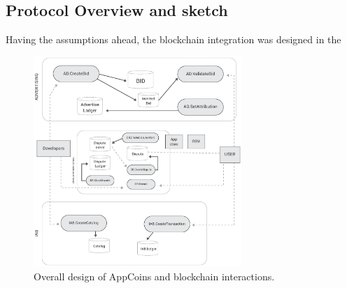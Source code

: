 \subsection{Protocol Overview and sketch}


Having the assumptions ahead, the blockchain integration was designed in the 

\begin{figure}[!ht]
\centering
\includegraphics[width=0.7\textwidth]{diagrams/design.eps}
\caption{Overall design of AppCoins and blockchain interactions.}
\label{fig:design}
\end{figure}






%


